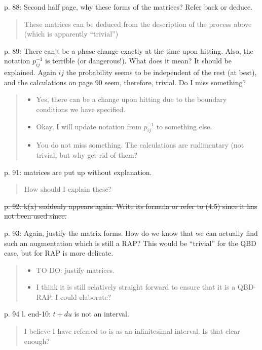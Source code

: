 \documentclass[a4paper]{article}
\begin{document}
p. 88: Second half page, why these forms of the matrices? Refer back or deduce.
\begin{quote}
    These matrices can be deduced from the description of the process above (which is apparently ``trivial'')
\end{quote}

p. 89: There can't be a phase change exactly at the time upon hitting. Also, the notation \(p_{ij}^{-1}\) is terrible (or dangerous!). What does it mean? It should be explained. Again \(ij\)
the probability seems to be independent of the rest (at best), and the calculations on page 90 seem, therefore, trivial. Do I miss something?
\begin{quote}
    \begin{itemize}
        \item Yes, there can be a change upon hitting due to the boundary conditions we have specified. 
        \item Okay, I will update notation from \(p_{ij}^{-1}\) to something else. 
        \item You do not miss something. The calculations are rudimentary (not trivial, but why get rid of them? 
    \end{itemize}
\end{quote}

p. 91: matrices are put up without explanation.
\begin{quote}
    How should I explain these?
\end{quote}

\st{p. 92: k(x) suddenly appears again. Write its formula or refer to (4.5) since it has not been used since.}

p. 93: Again, justify the matrix forms. How do we know that we can actually find such an augmentation which is still a RAP? This would be “trivial” for the QBD case, but for RAP is more delicate.
\begin{quote}
    \begin{itemize}
        \item TO DO: justify matrices. 
        \item I think it is still relatively straight forward to ensure that it is a QBD-RAP. I could elaborate? 
    \end{itemize}
\end{quote}

p. 94 l. end-10: \(t + du\) is not an interval.
\begin{quote}
    I believe I have referred to is as an infinitesimal interval. Is that clear enough?
\end{quote}
\end{document}
